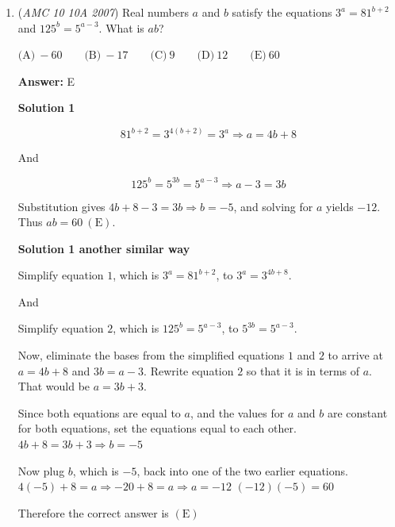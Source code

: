 \begin{enumerate}
 Therefore the answer is $\mathrm{(D)}$.

 



\textbf{Solution 3}

Using the previous drawing we know that ACD and DAC are both equal to 20 (40/2 or (180-40)/2). We also know that BAC and BCA are both 70 or (180-40)/2. Thus BDA is 70-20 which is equal to 50. 

 -RealityWrites

 


	\item (\textit{AMC 10 10A 2007}) Real numbers $a$ and $b$ satisfy the equations $3^{a} = 81^{b + 2}$ and $125^{b} = 5^{a - 3}$. What is $ab$?


 $\text{(A)}\ -60 \qquad \text{(B)}\ -17 \qquad \text{(C)}\ 9 \qquad \text{(D)}\ 12 \qquad \text{(E)}\ 60$

 \textbf{Answer: }E



\textbf{Solution 1}


 \[81^{b+2} = 3^{4(b+2)} = 3^a \Longrightarrow a = 4b+8\]

 And

 
 \[125^{b} = 5^{3b} = 5^{a-3} \Longrightarrow a - 3 = 3b\]

 Substitution gives $4b+8 - 3 = 3b \Longrightarrow b = -5$, and solving for $a$ yields $-12$. Thus $ab = 60\ \mathrm{(E)}$.

 



\textbf{Solution 1 another similar way}

Simplify equation $1$, which is $3^a=81^{b+2}$, to $3^a=3^{4b+8}$. 

 And

 Simplify equation $2$, which is $125^b=5^{a-3}$, to $5^{3b}=5^{a-3}$.

 Now, eliminate the bases from the simplified equations $1$ and $2$ to arrive at $a=4b+8$ and $3b=a-3$. Rewrite equation $2$ so that it is in terms of $a$. That would be $a=3b+3$.

 Since both equations are equal to $a$, and the values for $a$ and $b$ are constant for both equations, set the equations equal to each other.$4b+8=3b+3 \Longrightarrow b=-5$

 Now plug $b$, which is $-5$, back into one of the two earlier equations.$4(-5)+8=a \Longrightarrow -20+8=a \Longrightarrow a=-12$
$(-12)(-5)=60$

 Therefore the correct answer is $\mathrm{(E)}$




\end{enumerate}

